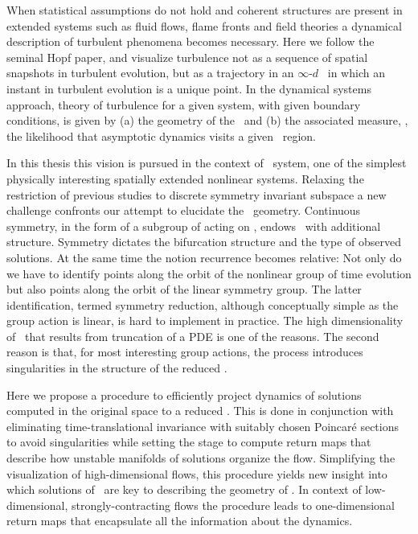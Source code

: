 
When statistical assumptions do not hold and coherent
structures are present in extended systems
such as fluid flows, flame fronts and field theories
a dynamical description of turbulent phenomena becomes
necessary.
Here we follow the seminal Hopf paper, and  visualize
turbulence not as  a sequence of spatial snapshots in turbulent evolution,
but as a trajectory in an  $\infty$-$d$ \statesp\ in which an
instant in turbulent evolution is a {unique} point. In the dynamical systems approach,
theory of turbulence for a given system, with given boundary conditions,
is given by (a) the geometry of the \statesp\ and (b) the associated measure,
\ie, the likelihood that asymptotic dynamics visits a given \statesp\ region.

In this thesis this vision is pursued in the context of \KS\
system, one of the simplest physically interesting spatially
extended nonlinear systems. Relaxing the restriction of
previous studies to discrete
symmetry invariant subspace a new challenge confronts our
attempt to elucidate the \statesp\ geometry. Continuous
symmetry, in the form of a subgroup of  acting on
\statesp, endows \statesp\ with additional structure.
Symmetry dictates the bifurcation structure and the type of
observed solutions. At the same time the notion recurrence becomes
relative: Not only do we have to identify points along the
orbit of the nonlinear group of time evolution but also points
along the orbit of the linear symmetry group. The latter
identification, termed symmetry reduction, although
conceptually simple as the group action is linear, is hard to
implement in practice. The high dimensionality of \statesp\
that results from truncation of a PDE is one of the reasons.
The second reason is that, for most interesting group actions,
the process introduces singularities in the structure of the
reduced \statesp.

Here we propose a procedure to efficiently project dynamics of
solutions computed in the original space to a reduced \statesp.
This is done in conjunction with eliminating time-translational
invariance with suitably chosen Poincar\'e sections to avoid
singularities while setting the stage to compute return maps
that describe how unstable manifolds of solutions organize the
flow. Simplifying the visualization of high-dimensional flows,
this procedure yields new insight into which solutions of \KSe\
are key to describing the geometry of \statesp. In context of
low-dimensional, strongly-contracting flows the procedure leads
to one-dimensional return maps that encapsulate all the
information about the dynamics.
